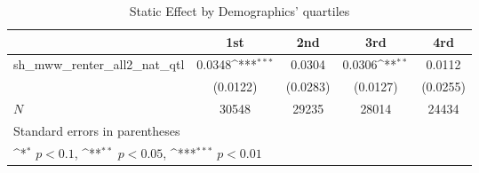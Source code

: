 \begin{table}[htbp]\centering
\def\sym#1{\ifmmode^{#1}\else\(^{#1}\)\fi}
\caption{Static Effect by Demographics' quartiles}
\begin{tabular}{l*{4}{c}}
\hline\hline
            &\multicolumn{1}{c}{1st}&\multicolumn{1}{c}{2nd}&\multicolumn{1}{c}{3rd}&\multicolumn{1}{c}{4rd}\\
\hline
sh\_mww\_renter\_all2\_nat\_qtl&      0.0348\sym{***}&      0.0304         &      0.0306\sym{**} &      0.0112         \\
            &    (0.0122)         &    (0.0283)         &    (0.0127)         &    (0.0255)         \\
\hline
\(N\)       &       30548         &       29235         &       28014         &       24434         \\
\hline\hline
\multicolumn{5}{l}{\footnotesize Standard errors in parentheses}\\
\multicolumn{5}{l}{\footnotesize \sym{*} \(p<0.1\), \sym{**} \(p<0.05\), \sym{***} \(p<0.01\)}\\
\end{tabular}
\end{table}
